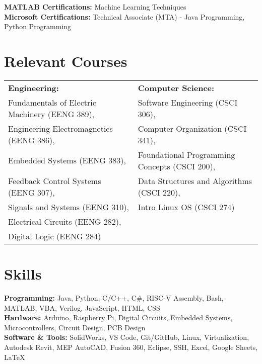 \documentclass[11pt]{article}       %
\begin{document}
\textbf{MATLAB Certifications:} Machine Learning Techniques \\
\textbf{Microsoft Certifications:} Technical Associate (MTA) - Java Programming, Python Programming

\vspace{-8pt}
\section*{Relevant Courses}
\vspace{3pt}
\noindent
\begin{tabular}{@{}p{}@{\hspace{1em}}p{}@{}}
\textbf{Engineering:} & \textbf{Computer Science:} \\
Fundamentals of Electric Machinery (EENG 389),      & Software Engineering (CSCI 306), \\
Engineering Electromagnetics (EENG 386),             & Computer Organization (CSCI 341), \\
Embedded Systems (EENG 383),                         & Foundational Programming Concepts (CSCI 200), \\
Feedback Control Systems (EENG 307),                 & Data Structures and Algorithms (CSCI 220), \\
Signals and Systems (EENG 310),                      & Intro Linux OS (CSCI 274) \\
Electrical Circuits (EENG 282),                      &  \\
Digital Logic (EENG 284)                             & 
\end{tabular}

\vspace{-8pt}
\section*{Skills}
\vspace{3pt}

\textbf{Programming:} Java, Python, C/C++, C\#, RISC-V Assembly, Bash, MATLAB, VBA, Verilog, JavaScript, HTML, CSS \\
\textbf{Hardware:} Arduino, Raspberry Pi, Digital Circuits, Embedded Systems, Microcontrollers, Circuit Design, PCB Design \\
\textbf{Software \& Tools:} SolidWorks, VS Code, Git/GitHub, Linux, Virtualization, Autodesk Revit, MEP AutoCAD, Fusion 360, Eclipse, SSH, Excel, Google Sheets, LaTeX
\end{document}
